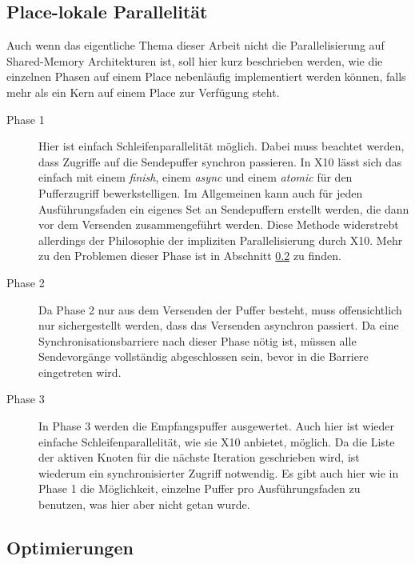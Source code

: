 \subsection{Place-lokale Parallelität} %
\label{sub:place_lokale_parallelit_t}
Auch wenn das eigentliche Thema dieser Arbeit nicht die Parallelisierung auf Shared-Memory Architekturen ist, soll hier kurz beschrieben werden, wie die einzelnen Phasen auf einem Place nebenläufig implementiert werden können, falls mehr als ein Kern auf einem Place zur Verfügung steht.
\begin{description}
	\item[Phase 1] Hier ist einfach Schleifenparallelität möglich. Dabei muss beachtet werden, dass Zugriffe auf die Sendepuffer synchron passieren. In X10 lässt sich das einfach mit einem \textit{finish}, einem \textit{async} und einem \textit{atomic} für den Pufferzugriff bewerkstelligen. Im Allgemeinen kann auch für jeden Ausführungsfaden ein eigenes Set an Sendepuffern erstellt werden, die dann vor dem Versenden zusammengeführt werden. Diese Methode widerstrebt allerdings der Philosophie der impliziten Parallelisierung durch X10. Mehr zu den Problemen dieser Phase ist in Abschnitt \ref{sub:optimierungen} zu finden.	
	\item[Phase 2] Da Phase 2 nur aus dem Versenden der Puffer besteht, muss offensichtlich nur sichergestellt werden, dass das Versenden asynchron passiert. Da eine Synchronisationsbarriere nach dieser Phase nötig ist, müssen alle Sendevorgänge vollständig abgeschlossen sein, bevor in die Barriere eingetreten wird.
	\item[Phase 3] In Phase 3 werden die Empfangspuffer ausgewertet. Auch hier ist wieder einfache Schleifenparallelität, wie sie X10 anbietet, möglich. Da die Liste der aktiven Knoten für die nächste Iteration geschrieben wird, ist wiederum ein synchronisierter Zugriff notwendig. Es gibt auch hier wie in Phase 1 die Möglichkeit, einzelne Puffer pro Ausführungsfaden zu benutzen, was hier aber nicht getan wurde.
\end{description}

\subsection{Optimierungen} %
\label{sub:optimierungen}

